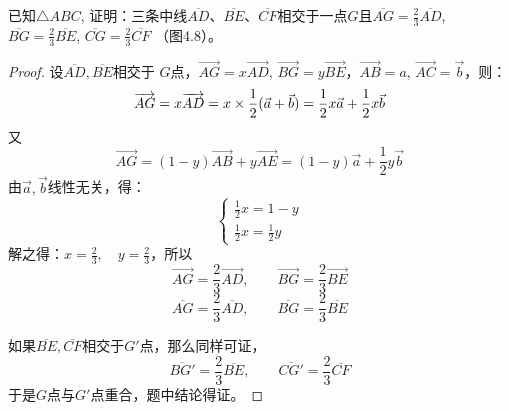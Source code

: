 \begin{figure}[htp]\centering
    \begin{minipage}[t]{0.48\textwidth}
    \centering
{}
    \caption{}
    \end{minipage}
    \begin{minipage}[t]{0.48\textwidth}
    \centering
    \caption{}
    \end{minipage}
    \end{figure}


\begin{example}
    已知$\triangle ABC$, 证明：三条中线$\overline{AD}$、$\overline{BE}$、$\overline{CF}$相交于一点$G$且$\overline{AG}=\frac{2}{3} \overline{AD}$, $\overline{BG}=\frac{2}{3}\overline{BE}$, $\overline{CG}=\frac{2}{3}\overline{CF}$ （图4.8）。
\end{example}

\begin{proof}
    设$\overline{AD},\overline{BE}$相交于
    $G$点，$\Vec{AG}=x\Vec{AD}$, $\Vec{BG}=y\Vec{BE}$，$\Vec{AB}=a$, $\Vec{AC}=\vec{b}$，则：
\[\overrightarrow{AG}=x\overrightarrow{AD}=x\times \dfrac{1}{2}(\vec{a}+\vec{b})=\dfrac{1}{2}x\vec{a}+\dfrac{1}{2}x\vec{b}\]
又    
\[\Vec{AG}=(1-y)\Vec{AB}+y\Vec{AE}=(1-y)\vec{a}+\frac{1}{2}y\vec{b}\]
由$\vec{a},\vec{b}$线性无关，得：
\[\begin{cases}
    \frac{1}{2}x=1-y\\
    \frac{1}{2}x=\frac{1}{2}y
\end{cases}\]
解之得：$x=\frac{2}{3},\quad y=\frac{2}{3}$，所以
\[\Vec{AG}=\frac{2}{3}\Vec{AD},\qquad \Vec{BG}=\frac{2}{3}\Vec{BE}\]
\[\overline{AG}=\frac{2}{3}\overline{AD},\qquad \overline{BG}=\frac{2}{3}\overline{BE}\]

如果$\overline{BE},\overline{CF}$相交于$G'$点，那么同样可证，
\[\overline{BG'}=\frac{2}{3} \overline{BE},\qquad \overline{CG'}=\frac{2}{3}\overline{CF}\]
于是$G$点与$G'$点重合，题中结论得证。
\end{proof}

